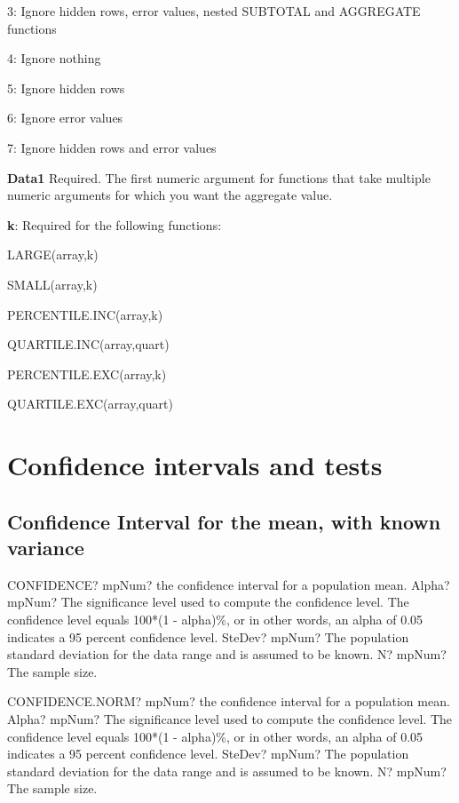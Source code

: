 3: Ignore hidden rows, error values, nested SUBTOTAL and AGGREGATE functions 

4: Ignore nothing 

5: Ignore hidden rows 

6: Ignore error values 

7: Ignore hidden rows and error values 

\vspace{0.3cm}
\textsf{\textbf{Data1}}     Required. The first numeric argument for functions that take multiple numeric arguments for which you want the aggregate value.

\vspace{0.3cm}
\textsf{\textbf{k}}: Required for the following functions:

LARGE(array,k) 

SMALL(array,k) 

PERCENTILE.INC(array,k) 

QUARTILE.INC(array,quart) 

PERCENTILE.EXC(array,k) 

QUARTILE.EXC(array,quart) 



\newpage
\section{Confidence intervals and tests}
\subsection{Confidence Interval for the mean, with known variance}

\begin{mpFunctionsExtract}
	\mpWorksheetFunctionThreeNotImplemented
	{CONFIDENCE? mpNum? the confidence interval for a population mean.}
	{Alpha? mpNum? The significance level used to compute the confidence level. The confidence level equals 100*(1 - alpha)\%, or in other words, an alpha of 0.05 indicates a 95 percent confidence level.
	}
	{SteDev? mpNum? The population standard deviation for the data range and is assumed to be known.}
	{N? mpNum? The sample size.}
\end{mpFunctionsExtract}

\vspace{0.6cm}
\begin{mpFunctionsExtract}
	\mpWorksheetFunctionThreeNotImplemented
	{CONFIDENCE.NORM? mpNum? the confidence interval for a population mean.}
	{Alpha? mpNum? The significance level used to compute the confidence level. The confidence level equals 100*(1 - alpha)\%, or in other words, an alpha of 0.05 indicates a 95 percent confidence level.
	}
	{SteDev? mpNum? The population standard deviation for the data range and is assumed to be known.}
	{N? mpNum? The sample size.}
\end{mpFunctionsExtract}



